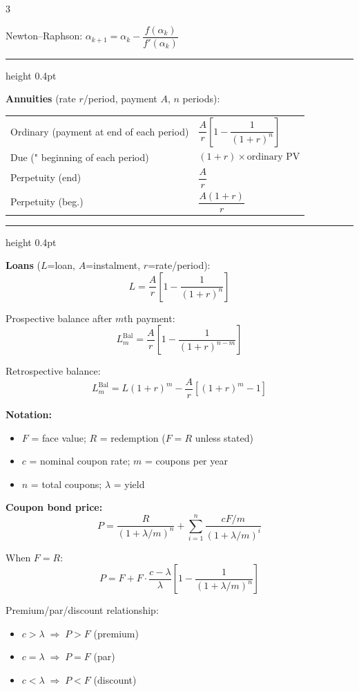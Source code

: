 \documentclass[9pt, a4paper, landscape]{extarticle}
\newcommand{\chbox}[2]{%
  \begin{tcolorbox}[sheet, title={\bfseries\small #1}]
  #2
  \end{tcolorbox}%
}
\newcommand{\boxrule}{\vspace{3pt}\textcolor{ruleclr}{\hrule height 0.4pt}\vspace{3pt}}
\begin{document}
\begin{multicols}{3}
{Newton--Raphson: $\alpha_{k+1}=\alpha_k-\dfrac{f(\alpha_k)}{f'(\alpha_k)}$

\boxrule

\textbf{Annuities} (rate $r$/period, payment $A$, $n$ periods):

\begin{tabular}{@{}ll@{}}
  Ordinary (payment at end of each period) & $\dfrac{A}{r}\!\left[1-\dfrac{1}{(1+r)^n}\right]$ \\[7pt]
  Due (" beginning of each period) & $$(1+r)\times\text{ordinary PV}$$ \\[4pt]
  Perpetuity (end) & $\dfrac{A}{r}$ \\[5pt]
  Perpetuity (beg.) & $\dfrac{A(1+r)}{r}$ \\
\end{tabular}

\boxrule

\textbf{Loans} ($L$=loan, $A$=instalment, $r$=rate/period):
\[L=\frac{A}{r}\!\left[1-\frac{1}{(1+r)^n}\right]\]

Prospective balance after $m$th payment:
\[L_m^{\text{Bal}}=\frac{A}{r}\!\left[1-\frac{1}{(1+r)^{n-m}}\right]\]

Retrospective balance:
\[L_m^{\text{Bal}}=L(1+r)^m-\frac{A}{r}\!\left[(1+r)^m-1\right]\]
}

\chbox{Chapter 2 --- Bonds \& Term Structure}{

\textbf{Notation:}
\begin{itemize}
  \item $F$ = face value;\; $R$ = redemption ($F=R$ unless stated)
  \item $c$ = nominal coupon rate;\; $m$ = coupons per year
  \item $n$ = total coupons;\; $\lambda$ = yield
\end{itemize}

\textbf{Coupon bond price:}
\[
P=\frac{R}{(1+\lambda/m)^n}+\sum_{i=1}^n\frac{cF/m}{(1+\lambda/m)^i}
\]

When $F=R$:
\[
P=F+F\cdot\frac{c-\lambda}{\lambda}\!\left[1-\frac{1}{(1+\lambda/m)^n}\right]
\]

Premium/par/discount relationship:
\begin{itemize}
  \item $c > \lambda \;\Rightarrow\; P > F$ \quad (premium)
  \item $c = \lambda \;\Rightarrow\; P = F$ \quad (par)
  \item $c < \lambda \;\Rightarrow\; P < F$ \quad (discount)
\end{itemize}

}
\end{multicols}
\end{document}
